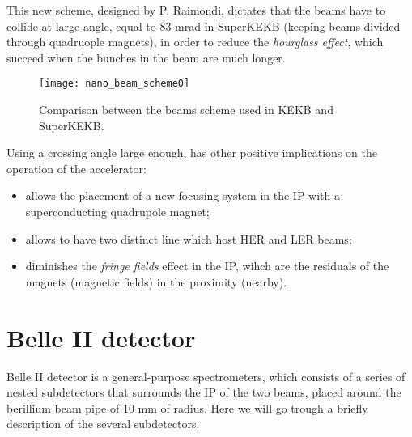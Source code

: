 This new scheme, designed by P. Raimondi, dictates that the beams have to collide at large angle, equal to 83 mrad in SuperKEKB (keeping beams divided through quadruople magnets), in order to reduce the \textit{hourglass effect}, which succeed when the bunches in the beam are much longer.\\

\begin{figure}[h!]
\centering
\texttt{[image: nano\_beam\_scheme0]}
\caption{Comparison between the beams scheme used in KEKB and SuperKEKB.}
\label{fig:beam_scheme_comparison}
\end{figure}

Using a crossing angle large enough, has other positive implications on the operation of the accelerator:

\begin{itemize}
\item allows the placement of a new focusing system in the IP with a superconducting quadrupole magnet;
\item allows to have two distinct line which host HER and LER beams;
\item diminishes the \textit{fringe fields} effect in the IP, wihch are the residuals of the magnets (magnetic fields) in the proximity (nearby). 
\end{itemize}

\begin{comment}
In figure \vref{fig:beampar} are reported the main machine parameters (default value) of the SuperKEKB accelerator.

\begin{figure}[h!]
\centering
\texttt{[image: beam\_par]}
\caption{Machine parameters of SuperKEKB. The mark ''*'' indicate values in the IP.}
\label{fig:beampar}
\end{figure}
\end{comment}


\section{Belle II detector}


Belle II detector is a general-purpose spectrometers, which consists of a series of nested subdetectors that surrounds the IP of the two beams, placed around the berillium beam pipe of 10 mm of radius. Here we will go trough a briefly description of the several subdetectors. 

